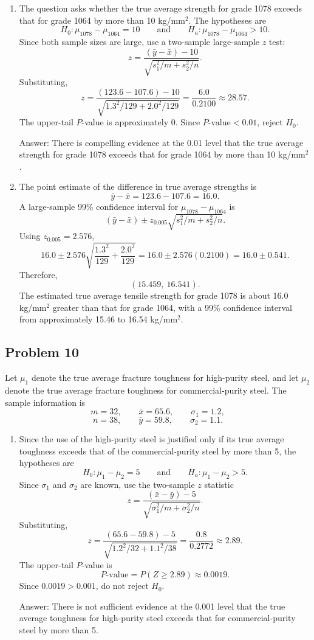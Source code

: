 \documentclass[11pt]{article}
\begin{document}
\begin{enumerate}
\item[(a)] The question asks whether the true average strength for grade 1078 exceeds that for grade 1064 by more than 10 kg/mm$^2$. The hypotheses are
\[
H_0:\mu_{1078}-\mu_{1064}=10
\qquad \text{and} \qquad
H_a:\mu_{1078}-\mu_{1064}>10.
\]
Since both sample sizes are large, use a two-sample large-sample $z$ test:
\[
z=\frac{(\bar{y}-\bar{x})-10}{\sqrt{s_1^2/m+s_2^2/n}}.
\]
Substituting,
\[
z=\frac{(123.6-107.6)-10}{\sqrt{1.3^2/129+2.0^2/129}}
=\frac{6.0}{0.2100}
\approx 28.57.
\]
The upper-tail $P$-value is approximately 0. Since $P\text{-value}<0.01$, reject $H_0$.

Answer: There is compelling evidence at the 0.01 level that the true average strength for grade 1078 exceeds that for grade 1064 by more than 10 kg/mm$^2$.

\item[(b)] The point estimate of the difference in true average strengths is
\[
\bar{y}-\bar{x}=123.6-107.6=16.0.
\]
A large-sample 99\% confidence interval for $\mu_{1078}-\mu_{1064}$ is
\[
(\bar{y}-\bar{x})\pm z_{0.005}\sqrt{s_1^2/m+s_2^2/n}.
\]
Using $z_{0.005}=2.576$,
\[
16.0\pm 2.576\sqrt{\frac{1.3^2}{129}+\frac{2.0^2}{129}}
=16.0\pm 2.576(0.2100)
=16.0\pm 0.541.
\]
Therefore,
\[
(15.459,\ 16.541).
\]
The estimated true average tensile strength for grade 1078 is about 16.0 kg/mm$^2$ greater than that for grade 1064, with a 99\% confidence interval from approximately 15.46 to 16.54 kg/mm$^2$.
\end{enumerate}

\subsection*{Problem 10}

Let $\mu_1$ denote the true average fracture toughness for high-purity steel, and let $\mu_2$ denote the true average fracture toughness for commercial-purity steel. The sample information is
\[
m=32,
\qquad \bar{x}=65.6,
\qquad \sigma_1=1.2,
\]
\[
n=38,
\qquad \bar{y}=59.8,
\qquad \sigma_2=1.1.
\]

\begin{enumerate}
\item[(a)] Since the use of the high-purity steel is justified only if its true average toughness exceeds that of the commercial-purity steel by more than 5, the hypotheses are
\[
H_0:\mu_1-\mu_2=5
\qquad \text{and} \qquad
H_a:\mu_1-\mu_2>5.
\]
Since $\sigma_1$ and $\sigma_2$ are known, use the two-sample $z$ statistic
\[
z=\frac{(\bar{x}-\bar{y})-5}{\sqrt{\sigma_1^2/m+\sigma_2^2/n}}.
\]
Substituting,
\[
z=\frac{(65.6-59.8)-5}{\sqrt{1.2^2/32+1.1^2/38}}
=\frac{0.8}{0.2772}
\approx 2.89.
\]
The upper-tail $P$-value is
\[
P\text{-value}=P(Z\ge 2.89)\approx 0.0019.
\]
Since $0.0019>0.001$, do not reject $H_0$.

Answer: There is not sufficient evidence at the 0.001 level that the true average toughness for high-purity steel exceeds that for commercial-purity steel by more than 5.
\end{enumerate}
\end{document}
